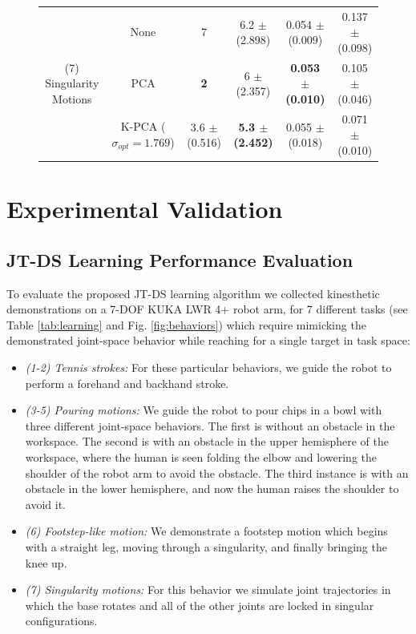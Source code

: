 \documentclass[letterpaper, 10 pt, conference,fleqn]{ieeeconf}
\begin{document}
\begin{figure}[!ht]
\begin{minipage}[b]{0.7\textwidth}
{\begin{tabular}{cc|cc|cc}
	\multicolumn{1}{c}{\multirow{3}{*}{(7) Singularity Motions}} & None & 7 & 6.2 $\pm$ (2.898) & 0.054 $\pm$ (0.009) & 0.137 $\pm$ (0.098)  \\
    \multicolumn{1}{c}{\multirow{3}{*}{($N=10,M=1467$)}} & PCA & \textbf{2} & 6 $\pm$ (2.357) & \textbf{ 0.053 $\pm$ (0.010) } & \cellcolor{blue!10} 0.105 $\pm$ (0.046) \\	
	& K-PCA ($\sigma_{opt} = 1.769$) & 3.6 $\pm$ (0.516) & \textbf{5.3 $\pm$ (2.452)} & 0.055 $\pm$ (0.018) & \cellcolor{blue!15} 0.071 $\pm$ (0.010)   \\ \hline\hline
\end{tabular}}
    \end{minipage}
    \vspace{-20pt}
\end{figure}

\newpage
\section{Experimental Validation} \label{Sec:Exp}
\subsection{JT-DS Learning Performance  Evaluation}
To evaluate the proposed JT-DS learning algorithm we collected kinesthetic demonstrations on a 7-DOF KUKA LWR 4+ robot arm, for 7 different tasks (see Table \ref{tab:learning} and Fig. \ref{fig:behaviors}) which require mimicking the demonstrated joint-space behavior while reaching for a single target in task space:
\begin{itemize}[leftmargin=*]
\item \textit{(1-2) Tennis strokes:} For these particular behaviors, we guide the robot to perform a forehand and backhand stroke.  
\item \textit{(3-5) Pouring motions:} We guide the robot to pour chips in a bowl with three different joint-space behaviors. The first is without an obstacle in the workspace. The second is with an obstacle in the upper hemisphere of the workspace, where the human is seen folding the elbow and lowering the shoulder of the robot arm to avoid the obstacle. The third instance is with an obstacle in the lower hemisphere, and now the human raises the shoulder to avoid it.
\item \textit{(6) Footstep-like motion:} We demonstrate a footstep motion which begins with a straight leg, moving through a singularity, and finally bringing the knee up.
\item \textit{(7) Singularity motions:} For this behavior we simulate joint trajectories in which the base rotates and all of the other joints are locked in singular configurations.
\end{itemize}
\end{document}
